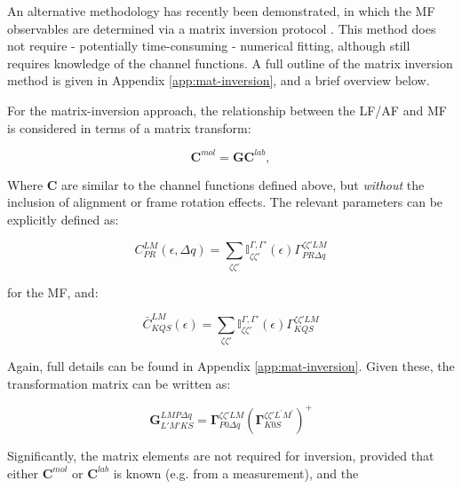 An alternative methodology has recently been demonstrated, in which the MF observables are determined via a matrix inversion protocol \cite{gregory2021MolecularFramePhotoelectron}. This method does not require - potentially time-consuming - numerical fitting, although still requires knowledge of the channel functions. A full outline of the matrix inversion method is given in Appendix \ref{app:mat-inversion}, and a brief overview below.

For the matrix-inversion approach, the relationship between the LF/AF and MF is considered in terms of a matrix transform:

\begin{equation}
\mathbf{C}^{mol}=\mathbf{G}\mathbf{C}^{lab},\label{eq:basic}
\end{equation}

Where $\mathbf{C}$ are similar to the channel functions defined above, but \textit{without} the inclusion of alignment or frame rotation effects. The relevant parameters can be explicitly defined as:

\begin{equation}
C_{PR}^{LM}(\epsilon,\Delta q)=\sum_{\zeta\zeta'}\mathbb{I}_{\zeta\zeta'}^{\Gamma,\Gamma'}(\epsilon)\Gamma_{PR\Delta q}^{\zeta\zeta'LM}
\end{equation}

for the MF, and:

\begin{equation}
\bar{C}_{KQS}^{LM}(\epsilon)=\sum_{\zeta\zeta'}\mathbb{I}_{\zeta\zeta'}^{\Gamma,\Gamma'}(\epsilon)\Gamma_{KQS}^{\zeta\zeta'LM}
\end{equation}

Again, full details can be found in Appendix \ref{app:mat-inversion}. Given these, the transformation matrix can be written as:

\begin{equation}
\mathbf{G}_{L'M'KS}^{LMP\Delta q}=\mathbf{\Gamma}_{P0\Delta q}^{\zeta\zeta'LM}(\mathbf{\Gamma}_{K0S}^{\zeta\zeta'L^{\prime}M^{\prime}})^{+}
\end{equation}

Significantly, the matrix elements are not required for inversion, provided that either $\mathbf{C}^{mol}$ or $\mathbf{C}^{lab}$ is known (e.g. from a measurement), and the 


